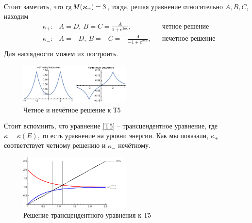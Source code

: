 Стоит заметить, что $\mathop{\mathrm{rg}}\nolimits M (\varkappa_{\pm}) = 3$, тогда, решая уравнение относительно $A, B, C$, находим
\begin{align*}
    &\kappa_+ \colon 
    &A = D, \ B=C=\frac{A}{1 + e^{2 a \kappa}}, 
    &&\text{четное решение} \\ 
    &\kappa_- \colon 
    &A = -D, \ B=-C=-\frac{A}{-1 + e^{2 a \kappa}}, 
    &&\text{нечетное решение} \\ 
\end{align*}
Для наглядности можем их построить.
\begin{figure}[ht]
    \centering
    \includegraphics[width=0.5\textwidth]{figures/T5.pdf}
    \caption{Четное и нечётное решение к Т5}
\end{figure}


Стоит вспомнить, что уравнение \eqref{T5} -- трансцендентное уравнение, где $\kappa = \kappa(E)$, то есть уравнение на уровни энергии. Как мы показали, $\kappa_+$ соответствует четному решению и $\kappa_-$ нечётному. 


\begin{figure}[h]
    \centering
    \includegraphics[width=0.5\textwidth]{figuresT5_fig2.pdf}
    \caption{Решение трансцендентного уравнения к Т5}
\end{figure}
